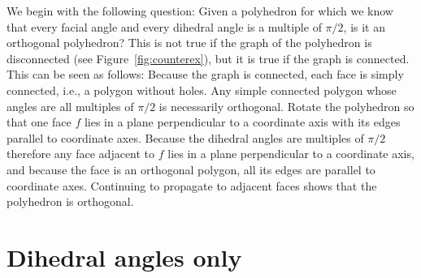 \documentclass[12pt]{article}
\begin{document}
We begin with the following question: Given a polyhedron
for which we know that every facial angle and every dihedral angle is
a multiple of $\pi/2$, is it an orthogonal polyhedron?  
This is not true if the graph of the polyhedron is disconnected
(see Figure~\ref{fig:counterex}), but it is true if the graph is
connected.  This can be seen as follows:  
Because the graph is connected, each face is simply connected, i.e., 
a polygon without holes.  Any simple connected polygon whose angles 
are all multiples 
of $\pi /2$ is necessarily orthogonal.  Rotate the polyhedron so that 
one face $f$ lies in a plane perpendicular to a coordinate axis with 
its edges parallel to coordinate axes.  Because the dihedral angles 
are multiples of $\pi /2$ therefore any face adjacent to $f$ lies in a 
plane perpendicular to a coordinate axis, and because the face is an 
orthogonal polygon, all  its edges are parallel to coordinate axes.   
Continuing to propagate to adjacent faces shows that the polyhedron is orthogonal.

\iffalse
\footnote{TB: If anyone can
think of a shorter way of describing this, please change what's here.}
Initially pick one facial angle that is not $\pi$ and rotate the 
polyhedron its two incident edges $e_1,e_2$ are parallel to coordinate axes.  
Let $v$
be the common endpoint of $e_1,e_2$, let $e_3$ be the edge after $e_2$ at $v$, and
let (for $i=1,2$) $f_i$ be the face between $e_i$ and $e_{i+1}$.
Face $f_1$ is in
the plane spanned by $e_1$ and $e_2$, hence perpendicular to a coordinate
axis.  Since the dihedral angle at $e_2$ is a multiple of $\pi/2$ and $e_2$
is parallel to a coordinate axis, hence $f_2$ is perpendicular to a 
coordinate axis.  Since the facial angle $e_2-v-e_3$ is a multiple of $\pi/2$,
$e_3$ is parallel to a coordinate axis.  Continuing the argument, all faces
and edges at $v$ are perpendicular/parallel to a coordinate axis.  Now consider
the other end $w$ of $e_2$.  The two incident faces $f_1,f_2$ of $e_2$ are
perpendicular to a coordinate axis, and the facial angles at $e_2$ and $w$
are multiples of $\pi/2$, so the edge before and after $e_2$ at $w$ are
also parallel to coordinate axes.  Now we repeat the argument at $w$, and 
from there along incident edges to the rest of the graph, which reaches
all faces since the graph is connected.  So all faces/edges are 
perpendicular/parallel to coordinate axes as desired.
\fi

\section{Dihedral angles only}
\end{document}
